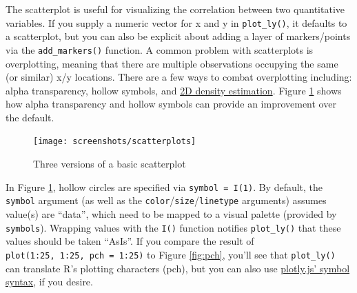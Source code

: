 \documentclass[12pt,]{isuthesis}
\newenvironment{Shaded}{\begin{snugshade}}{\end{snugshade}}
\newcommand{\KeywordTok}[1]{\textcolor[rgb]{0.13,0.29,0.53}{\textbf{{#1}}}}
\newcommand{\DataTypeTok}[1]{\textcolor[rgb]{0.13,0.29,0.53}{{#1}}}
\newcommand{\DecValTok}[1]{\textcolor[rgb]{0.00,0.00,0.81}{{#1}}}
\newcommand{\FloatTok}[1]{\textcolor[rgb]{0.00,0.00,0.81}{{#1}}}
\newcommand{\StringTok}[1]{\textcolor[rgb]{0.31,0.60,0.02}{{#1}}}
\newcommand{\NormalTok}[1]{{#1}}
\begin{document}
The scatterplot is useful for visualizing the correlation between two
quantitative variables. If you supply a numeric vector for x and y in
\texttt{plot\_ly()}, it defaults to a scatterplot, but you can also be
explicit about adding a layer of markers/points via the
\texttt{add\_markers()} function. A common problem with scatterplots is
overplotting, meaning that there are multiple observations occupying the
same (or similar) x/y locations. There are a few ways to combat
overplotting including: alpha transparency, hollow symbols, and
\protect\hyperlink{rectangular-binning-in-R}{2D density estimation}.
Figure \ref{fig:scatterplots} shows how alpha transparency and hollow
symbols can provide an improvement over the default.

\begin{Shaded}
\end{Shaded}

\begin{figure}
\centering
\texttt{[image: screenshots/scatterplots]}
\caption{\label{fig:scatterplots}Three versions of a basic scatterplot}
\end{figure}

In Figure \ref{fig:scatterplots}, hollow circles are specified via
\texttt{symbol\ =\ I(1)}. By default, the \texttt{symbol} argument (as
well as the \texttt{color}/\texttt{size}/\texttt{linetype} arguments)
assumes value(s) are ``data'', which need to be mapped to a visual
palette (provided by \texttt{symbols}). Wrapping values with the
\texttt{I()} function notifies \texttt{plot\_ly()} that these values
should be taken ``AsIs''. If you compare the result of
\texttt{plot(1:25,\ 1:25,\ pch\ =\ 1:25)} to Figure \ref{fig:pch},
you'll see that \texttt{plot\_ly()} can translate R's plotting
characters (pch), but you can also use
\href{https://plot.ly/r/reference/\#scatter-marker-symbol}{plotly.js'
symbol syntax}, if you desire.
\end{document}
